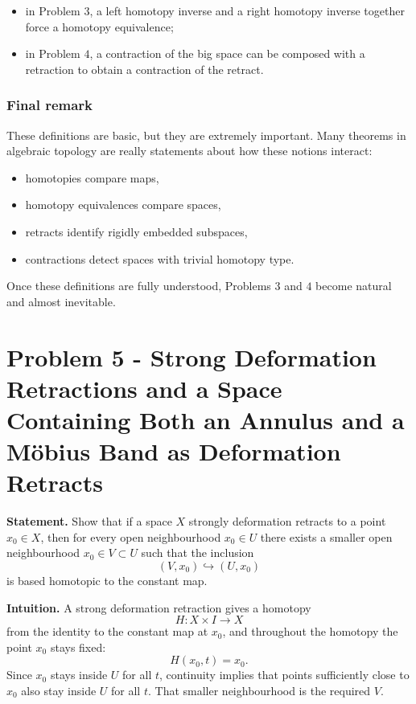 \documentclass[12pt,a4paper]{article}
\theoremstyle{notespace}
\begin{document}
\begin{itemize}
	\item in Problem \(3\), a left homotopy inverse and a right homotopy inverse together force a homotopy equivalence;
	\item in Problem \(4\), a contraction of the big space can be composed with a retraction to obtain a contraction of the retract.
\end{itemize}

\subsubsection{Final remark}

These definitions are basic, but they are extremely important.  
Many theorems in algebraic topology are really statements about how these notions interact:

\begin{itemize}
	\item homotopies compare maps,
	\item homotopy equivalences compare spaces,
	\item retracts identify rigidly embedded subspaces,
	\item contractions detect spaces with trivial homotopy type.
\end{itemize}

Once these definitions are fully understood, Problems \(3\) and \(4\) become natural and almost inevitable.
	

\section{Problem 5 - Strong Deformation Retractions and a Space Containing Both an Annulus and a Möbius Band as Deformation Retracts}

\textbf{Statement.}
Show that if a space \(X\) strongly deformation retracts to a point \(x_0 \in X\), then for every open neighbourhood \(x_0 \in U\) there exists a smaller open neighbourhood \(x_0 \in V \subset U\) such that the inclusion
\[
(V,x_0)\hookrightarrow (U,x_0)
\]
is based homotopic to the constant map.

\medskip

\textbf{Intuition.}
A strong deformation retraction gives a homotopy
\[
H:X\times I\to X
\]
from the identity to the constant map at \(x_0\), and throughout the homotopy the point \(x_0\) stays fixed:
\[
H(x_0,t)=x_0.
\]
Since \(x_0\) stays inside \(U\) for all \(t\), continuity implies that points sufficiently close to \(x_0\) also stay inside \(U\) for all \(t\). That smaller neighbourhood is the required \(V\).
\end{document}
